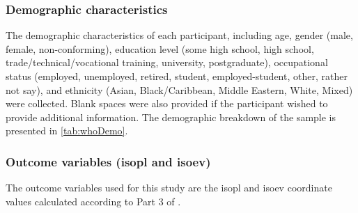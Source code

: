 

\subsubsection*{Demographic characteristics}
The demographic characteristics of each participant, including age, gender (male, female, non-conforming), education level (some high school, high school, trade/technical/vocational training, university, postgraduate), occupational status (employed, unemployed, retired, student, employed-student, other, rather not say), and ethnicity (Asian, Black/Caribbean, Middle Eastern, White, Mixed) were collected. Blank spaces were also provided if the participant wished to provide additional information. The demographic breakdown of the sample is presented in \cref{tab:whoDemo}.

\subsubsection*{Outcome variables (\gls{isopl} and \gls{isoev})}
\label{sec:whoOutcomeVar}
The outcome variables used for this study are the \gls{isopl} and \gls{isoev} coordinate values calculated according to Part 3 of \citet{ISO12913Part3}.

